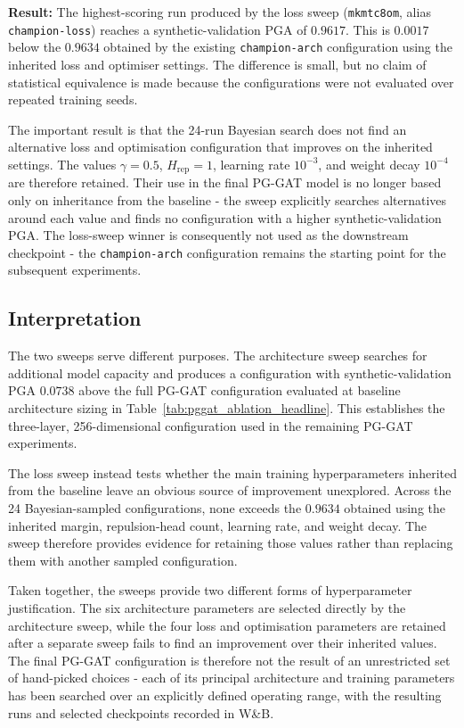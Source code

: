 \textbf{Result:}
The highest-scoring run produced by the loss sweep
(\texttt{mkmtc8om}, alias \texttt{champion-loss}) reaches a
synthetic-validation PGA of $0.9617$.
This is $0.0017$ below the $0.9634$ obtained by the existing
\texttt{champion-arch} configuration using the inherited loss
and optimiser settings.
The difference is small,
but no claim of statistical equivalence is made because the
configurations were not evaluated over repeated training seeds.

The important result is that the 24-run Bayesian search does not find
an alternative loss and optimisation configuration that improves on
the inherited settings.
The values $\gamma=0.5$,
$H_{\text{rep}}=1$,
learning rate $10^{-3}$,
and weight decay $10^{-4}$ are therefore retained.
Their use in the final PG-GAT model is no longer based only on
inheritance from the baseline -
the sweep explicitly searches alternatives around each value
and finds no configuration with a higher synthetic-validation PGA.
The loss-sweep winner is consequently not used as the downstream
checkpoint -
the \texttt{champion-arch} configuration remains the starting point
for the subsequent experiments.

\subsection{Interpretation}
\label{sec_res_pggat_sweep_discussion}

The two sweeps serve different purposes.
The architecture sweep searches for additional model capacity
and produces a configuration with synthetic-validation PGA $0.0738$
above the full PG-GAT configuration evaluated at baseline architecture
sizing in Table~\ref{tab:pggat_ablation_headline}.
This establishes the three-layer,
256-dimensional configuration used in the remaining PG-GAT experiments.

The loss sweep instead tests whether the main training hyperparameters
inherited from the baseline leave an obvious source of improvement
unexplored.
Across the 24 Bayesian-sampled configurations,
none exceeds the $0.9634$ obtained using the inherited margin,
repulsion-head count,
learning rate,
and weight decay.
The sweep therefore provides evidence for retaining those values
rather than replacing them with another sampled configuration.

Taken together, the sweeps provide two different forms of
hyperparameter justification.
The six architecture parameters are selected directly by the
architecture sweep,
while the four loss and optimisation parameters are retained
after a separate sweep fails to find an improvement over their
inherited values.
The final PG-GAT configuration is therefore not the result
of an unrestricted set of hand-picked choices -
each of its principal architecture and training parameters has been
searched over an explicitly defined operating range,
with the resulting runs and selected checkpoints recorded in W\&B.